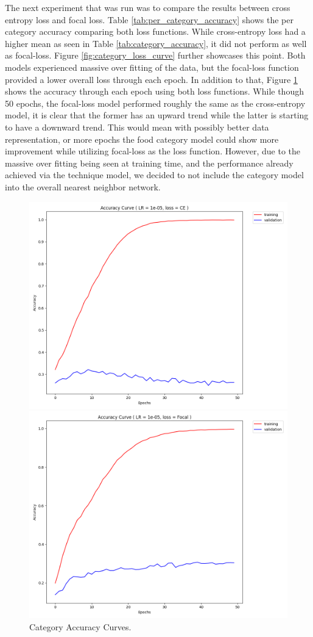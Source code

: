 \documentclass[10pt,twocolumn,letterpaper]{article}
\begin{document}
The next experiment that was run was to compare the results between cross entropy loss and focal loss. Table \ref{tab:per_category_accuracy} shows the per category accuracy comparing both loss functions. While cross-entropy loss had a higher mean as seen in Table \ref{tab:category_accuracy}, it did not perform as well as focal-loss. Figure \ref{fig:category_loss_curve} further showcases this point. Both models experienced massive over fitting of the data, but the focal-loss function provided a lower overall loss through each epoch. In addition to that, Figure \ref{fig:category_accuracy_curve} shows the accuracy through each epoch using both loss functions. While though 50 epochs, the focal-loss model performed roughly the same as the cross-entropy model, it is clear that the former has an upward trend while the latter is starting to have a downward trend. This would mean with possibly better data representation, or more epochs the food category model could show more improvement while utilizing focal-loss as the loss function. However, due to the massive over fitting being seen at training time, and the performance already achieved via the technique model, we decided to not include the category model into the overall nearest neighbor network. 

\begin{figure}
\begin{subfigure}
    \begin{left}
    \includegraphics[width=0.45\linewidth]{lr_1e-05_e50_CE_accuracy_history}
    \end{left}
\end{subfigure}%
\begin{subfigure}
    \begin{right}
    \includegraphics[width=0.45\linewidth]{lr_1e-05_e50_Focal_accuracy_history}
    \end{right}
\end{subfigure}%
  \caption{Category Accuracy Curves.}
\label{fig:category_accuracy_curve}
\end{figure}
\end{document}
